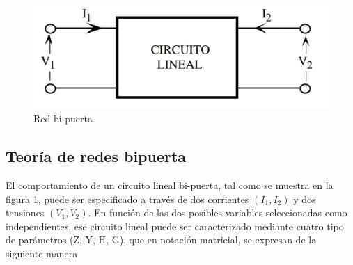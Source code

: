 \documentclass[10pt, a4paper]{article}
\begin{document}
    \begin{figure}[h!]
        \centering
        \includegraphics[height=4cm\textwidth]{circuito-lineal.jpg}
        \caption{Red bi-puerta}
        \label{fig:cir-lin}
    \end{figure}

    \subsection{Teoría de redes bipuerta}

    El comportamiento de un circuito lineal bi-puerta, tal como se muestra en la figura \ref{fig:cir-lin}, puede ser especificado a través de dos corrientes $(I_1, I_2)$ y dos tensiones $(V_1, V_2)$. En función de las dos posibles variables seleccionadas como independientes, ese circuito lineal puede ser caracterizado mediante cuatro tipo de parámetros ({Z}, {Y}, {H}, {G}), que en notación matricial, se expresan de la siguiente manera
\end{document}
